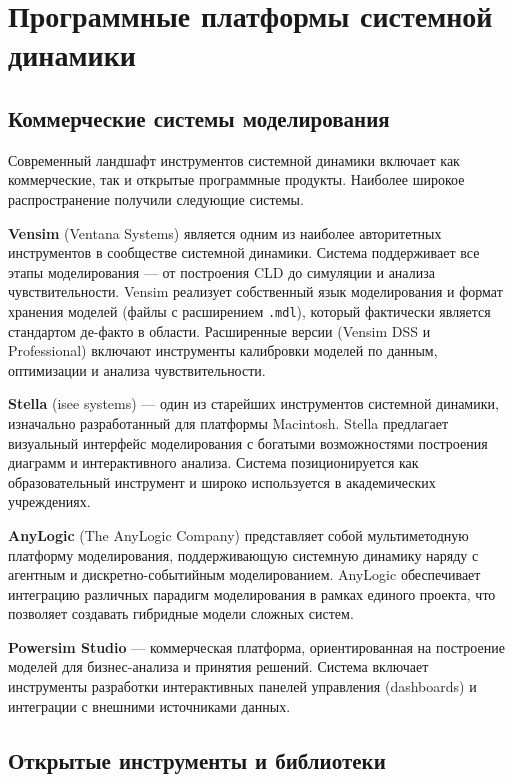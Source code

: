 \section{Программные платформы системной динамики}

\subsection{Коммерческие системы моделирования}

Современный ландшафт инструментов системной динамики включает как коммерческие, так и открытые программные продукты. Наиболее широкое распространение получили следующие системы.

\textbf{Vensim} (Ventana Systems) является одним из наиболее авторитетных инструментов в сообществе системной динамики. Система поддерживает все этапы моделирования --- от построения CLD до симуляции и анализа чувствительности. Vensim реализует собственный язык моделирования и формат хранения моделей (файлы с расширением \texttt{.mdl}), который фактически является стандартом де-факто в области. Расширенные версии (Vensim DSS и Professional) включают инструменты калибровки моделей по данным, оптимизации и анализа чувствительности.

\textbf{Stella} (isee systems) --- один из старейших инструментов системной динамики, изначально разработанный для платформы Macintosh. Stella предлагает визуальный интерфейс моделирования с богатыми возможностями построения диаграмм и интерактивного анализа. Система позиционируется как образовательный инструмент и широко используется в академических учреждениях.

\textbf{AnyLogic} (The AnyLogic Company) представляет собой мультиметодную платформу моделирования, поддерживающую системную динамику наряду с агентным и дискретно-событийным моделированием. AnyLogic обеспечивает интеграцию различных парадигм моделирования в рамках единого проекта, что позволяет создавать гибридные модели сложных систем.

\textbf{Powersim Studio} --- коммерческая платформа, ориентированная на построение моделей для бизнес-анализа и принятия решений. Система включает инструменты разработки интерактивных панелей управления (dashboards) и интеграции с внешними источниками данных.

\subsection{Открытые инструменты и библиотеки}

